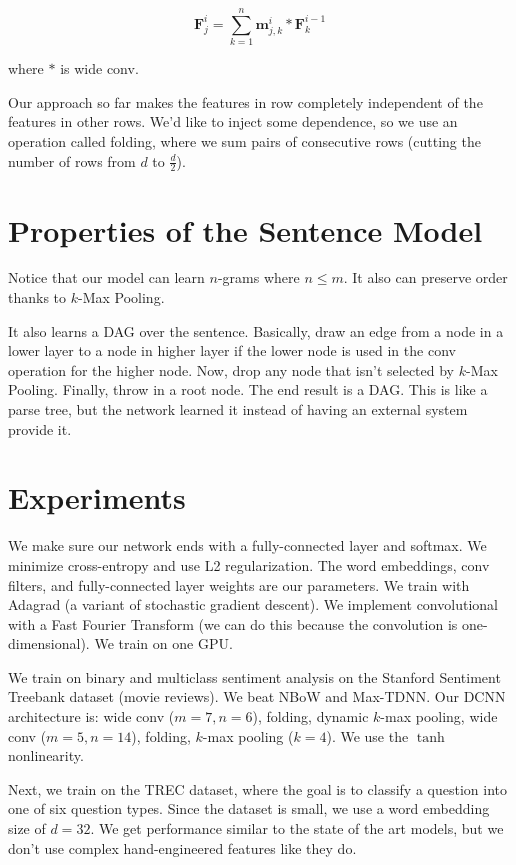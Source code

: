 \documentclass[a4paper]{article}
\begin{document}
$$
\mathbf{F}_{j}^{i} = \sum_{k=1}^{n}{\mathbf{m}_{j, k}^{i} *
\mathbf{F}_{k}^{i-1}}
$$

where $*$ is wide conv.

Our approach so far makes the features in row completely independent of
the features in other rows. We'd like to inject some dependence, so we use
an operation called folding, where we sum pairs of consecutive rows (cutting
the number of rows from $d$ to $\frac{d}{2}$).

\section{Properties of the Sentence Model}
Notice that our model can learn $n$-grams where $n \leq m$. It also can
preserve order thanks to $k$-Max Pooling.

It also learns a DAG over the sentence. Basically, draw an edge from a node
in a lower layer to a node in higher layer if the lower node is used in the
conv operation for the higher node. Now, drop any node that isn't selected
by $k$-Max Pooling. Finally, throw in a root node. The end result is a DAG.
This is like a parse tree, but the network learned it instead of having an
external system provide it.

\section{Experiments}
We make sure our network ends with a fully-connected layer and softmax.
We minimize cross-entropy and use L2 regularization. The word embeddings,
conv filters, and fully-connected layer weights are our parameters. We
train with Adagrad (a variant of stochastic gradient descent). We implement
convolutional with a Fast Fourier Transform (we can do this because the
convolution is one-dimensional). We train on one GPU.

We train on binary and multiclass sentiment analysis on the Stanford Sentiment
Treebank dataset (movie reviews). We beat NBoW and Max-TDNN. Our DCNN
architecture is: wide conv ($m = 7, n = 6$), folding, dynamic $k$-max pooling,
wide conv ($m = 5, n = 14$), folding, $k$-max pooling ($k = 4$). We use the
$\tanh$ nonlinearity.

Next, we train on the TREC dataset, where the goal is to classify a question
into one of six question types. Since the dataset is small, we use a word
embedding size of $d = 32$. We get performance similar to the state of
the art models, but we don't use complex hand-engineered features like they do.
\end{document}
